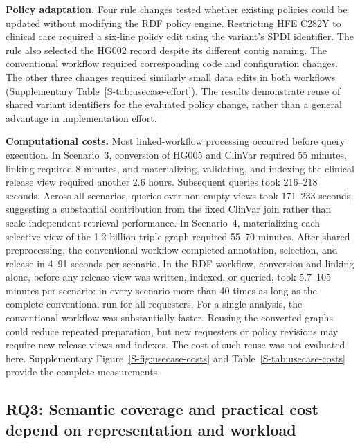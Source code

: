 \documentclass[pdflatex,sn-mathphys-num,referee]{sn-jnl}
\begin{document}
\textbf{Policy adaptation.}
Four rule changes tested whether existing policies could be updated without modifying the RDF policy engine.
Restricting HFE C282Y to clinical care required a six-line policy edit using the variant's SPDI identifier.
The rule also selected the HG002 record despite its different contig naming.
The conventional workflow required corresponding code and configuration changes.
The other three changes required similarly small data edits in both workflows (Supplementary Table~\ref{S-tab:usecase-effort}).
The results demonstrate reuse of shared variant identifiers for the evaluated policy change, rather than a general advantage in implementation effort.

\textbf{Computational costs.}
Most linked-workflow processing occurred before query execution.
In Scenario~3, conversion of HG005 and ClinVar required 55 minutes, linking required 8 minutes, and materializing, validating, and indexing the clinical release view required another 2.6 hours.
Subsequent queries took 216--218 seconds.
Across all scenarios, queries over non-empty views took 171--233 seconds, suggesting a substantial contribution from the fixed ClinVar join rather than scale-independent retrieval performance.
In Scenario~4, materializing each selective view of the 1.2-billion-triple graph required 55--70 minutes.
After shared preprocessing, the conventional workflow completed annotation, selection, and release in 4--91 seconds per scenario.
In the RDF workflow, conversion and linking alone, before any release view was written, indexed, or queried, took 5.7--105 minutes per scenario: in every scenario more than 40 times as long as the complete conventional run for all requesters.
For a single analysis, the conventional workflow was substantially faster.
Reusing the converted graphs could reduce repeated preparation, but new requesters or policy revisions may require new release views and indexes.
The cost of such reuse was not evaluated here.
Supplementary Figure~\ref{S-fig:usecase-costs} and Table~\ref{S-tab:usecase-costs} provide the complete measurements.


\subsection{RQ3: Semantic coverage and practical cost depend on representation and workload}\label{subsec:results-costs}
\end{document}
